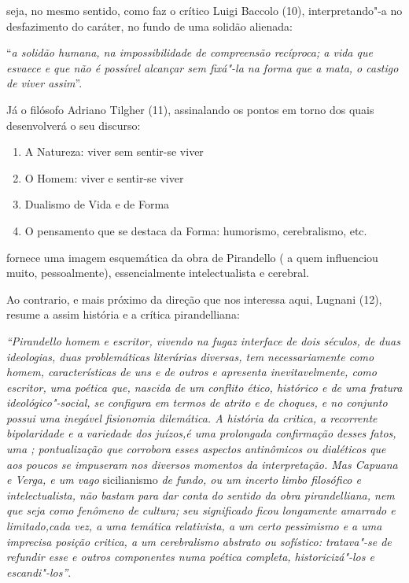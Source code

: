 seja, no mesmo sentido, como faz o crítico Luigi Baccolo (10),
interpretando"-a no desfazimento do caráter, no fundo de uma solidão
alienada:

``\emph{a solidão humana, na impossibilidade de compreensão recíproca; a
vida que esvaece e que não é possível alcançar sem fixá"-la na forma que
a mata, o castigo de viver assim}''.

Já o filósofo Adriano Tilgher (11), assinalando os pontos em torno dos
quais desenvolverá o seu discurso:

\begin{enumerate}
\def\labelenumi{\arabic{enumi}.}
\item
  A Natureza: viver sem sentir-se viver
\item
  O Homem: viver e sentir-se viver
\item
  Dualismo de Vida e de Forma
\item
  O pensamento que se destaca da Forma: humorismo, cerebralismo, etc.
\end{enumerate}

fornece uma imagem esquemática da obra de Pirandello ( a quem
influenciou muito, pessoalmente), essencialmente intelectualista e
cerebral.

Ao contrario, e mais próximo da direção que nos interessa aqui, Lugnani
(12), resume a assim história e a crítica pirandelliana:

\emph{``Pirandello homem e escritor, vivendo na fugaz interface de dois
séculos, de duas ideologias, duas problemáticas literárias diversas, tem
necessariamente como homem, características de uns e de outros e
apresenta inevitavelmente, como escritor, uma poética que, nascida de um
conflito ético, histórico e de uma fratura ideológico"-social, se
configura em termos de atrito e de choques, e no conjunto possui uma
inegável fisionomia dilemática. A história da critica, a recorrente
bipolaridade e a variedade dos juízos,é uma prolongada confirmação
desses fatos, uma ; pontualização que corrobora esses aspectos
antinômicos ou dialéticos que aos poucos se impuseram nos diversos
momentos da interpretação. Mas Capuana e Verga, e um vago} sicilianismo
\emph{de fundo, ou um incerto limbo filosófico e intelectualista, não
bastam para dar conta do sentido da obra pirandelliana, nem que seja
como fenômeno de cultura; seu significado ficou longamente amarrado e
limitado,cada vez, a uma temática relativista, a um certo pessimismo e a
uma imprecisa posição critica, a um cerebralismo abstrato ou sofístico:
tratava"-se de refundir esse e outros componentes numa poética completa,
historicizá"-los e escandi"-los''}.

